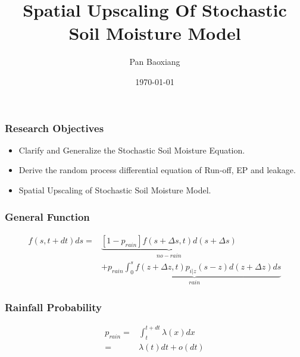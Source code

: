 \documentclass{beamer}
\begin{document}
\title{Spatial Upscaling Of Stochastic Soil Moisture Model}
\author{Pan Baoxiang}
\date{\today}
\maketitle

\begin{frame}
\frametitle{Research Objectives}
\begin{itemize}
\item Clarify and Generalize the Stochastic Soil Moisture Equation.
\item Derive the random process differential equation of Run-off, EP and leakage.
\item Spatial Upscaling of Stochastic Soil Moisture Model.
\end{itemize}
\end{frame}
\begin{frame}
\frametitle{General Function}
\begin{equation}
\begin{split}
f(s,t+dt)ds=&\underbrace{[1-p_{rain}]f(s+\Delta s,t)d(s+\Delta s)}_{no-rain}\\&+\underbrace{p_{rain} \int_{0}^{s} f(z+\Delta z,t)p_{i|z}(s-z)d(z+\Delta z)ds}_{rain}
\end{split}
\end{equation}
\end{frame}

\begin{frame}
\frametitle{Rainfall Probability}
\begin{equation}
\begin{split}
p_{rain}=&\int_t^{t+dt} \lambda(x)dx\\=&\lambda(t)dt+o(dt)
\end{split}
\end{equation}
\end{frame}
\end{document}
